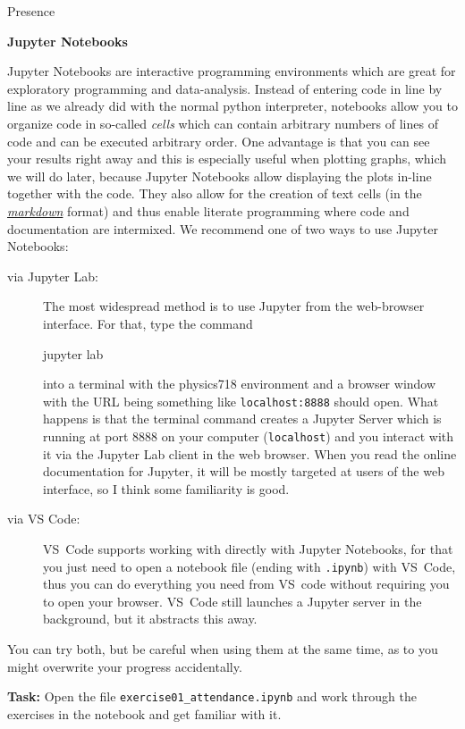 \documentclass[a4paper, draft=False]{scrartcl}
\begin{document}
\begin{exam}[Presence]{Presence}
\begin{instructions}
    \begin{problem*}\textbf{Jupyter Notebooks}

      Jupyter Notebooks are interactive programming environments which are great
      for exploratory programming and data-analysis. Instead of entering code in
      line by line as we already did with the normal python interpreter,
      notebooks allow you to organize code in so-called \emph{cells} which can
      contain arbitrary numbers of lines of code and can be executed arbitrary
      order. One advantage is that you can see your results right away and this
      is especially useful when plotting graphs, which we will do later, because
      Jupyter Notebooks allow displaying the plots in-line together with the
      code. They also allow for the creation of text cells (in the \href{%
        https://jupyter-notebook.readthedocs.io/en/latest/examples/Notebook/Working%
      }{\emph{markdown}} format) and thus enable literate programming where code
      and documentation are intermixed. We recommend one of two ways to use
      Jupyter Notebooks:

      \begin{description}
      \item[via Jupyter Lab:] The most widespread method is to use Jupyter from the web-browser
        interface. For that, type the command
        \begin{bashcode}
          jupyter lab
        \end{bashcode}
        into a terminal with the physics718 environment and a browser window
        with the URL being something like \texttt{localhost:8888} should open.
        What happens is that the terminal command creates a Jupyter Server which
        is running at port 8888 on your computer (\texttt{localhost}) and you
        interact with it via the Jupyter Lab client in the web browser. When you
        read the online documentation for Jupyter, it will be mostly targeted at
        users of the web interface, so I think some familiarity is good.
      \item[via VS Code:] VS~Code supports working with directly with Jupyter Notebooks, for
        that you just need to open a notebook file (ending with \texttt{.ipynb})
        with VS~Code, thus you can do everything you need from VS~code without
        requiring you to open your browser. VS~Code still launches a Jupyter
        server in the background, but it abstracts this away.
      \end{description}

      You can try both, but be careful when using them at the same time, as to
      you might overwrite your progress accidentally.

      \textbf{Task:} Open the file \texttt{exercise01\_attendance.ipynb} and
      work through the exercises in the notebook and get familiar with it.
    \end{problem*}
  \end{instructions}
\end{exam}
\end{document}

